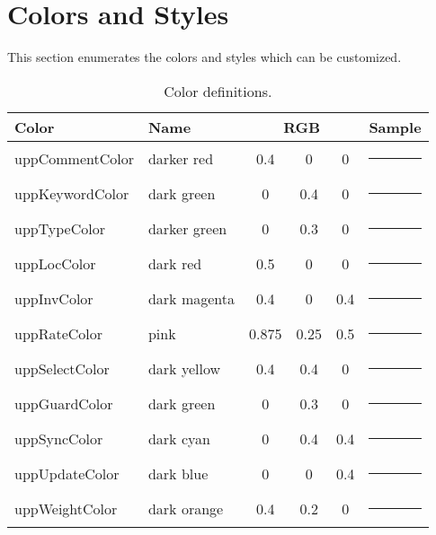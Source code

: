 \documentclass[a4paper,final]{article}
\begin{document}
\section{Colors and Styles}
This section enumerates the colors and styles which can be customized.

\begin{table}[ht]
  \caption{Color definitions.}\label{tab:colors}
  \centering
\begin{tabular}{llc@{, }c@{, }cl}
  \toprule
  {\bf Color} & {\bf Name} & \multicolumn{3}{c}{\bf RGB} & {\bf Sample} \\
  \midrule
  uppCommentColor & darker red & 0.4 & 0 & 0 & {\color{uppCommentColor}\rule{10mm}{3mm}} \\
  uppKeywordColor & dark green & 0 & 0.4 & 0 & {\color{uppKeywordColor}\rule{10mm}{3mm}} \\
  uppTypeColor & darker green & 0 & 0.3 & 0 & {\color{uppTypeColor}\rule{10mm}{3mm}} \\
  \midrule
  uppLocColor & dark red & 0.5 & 0 & 0 & {\color{uppLocColor}\rule{10mm}{3mm}} \\
  uppInvColor & dark magenta & 0.4 & 0 & 0.4 & {\color{uppInvColor}\rule{10mm}{3mm}} \\
  uppRateColor & pink & 0.875 & 0.25 & 0.5 & {\color{uppRateColor}\rule{10mm}{3mm}} \\
  uppSelectColor & dark yellow & 0.4 & 0.4 & 0 & {\color{uppSelectColor}\rule{10mm}{3mm}} \\
  uppGuardColor & dark green & 0 & 0.3 & 0 & {\color{uppGuardColor}\rule{10mm}{3mm}} \\
  uppSyncColor & dark cyan & 0 & 0.4 & 0.4 & {\color{uppSyncColor}\rule{10mm}{3mm}} \\
  uppUpdateColor & dark blue & 0 & 0 & 0.4 & {\color{uppUpdateColor}\rule{10mm}{3mm}} \\
  uppWeightColor & dark orange & 0.4 & 0.2 & 0 & {\color{uppWeightColor}\rule{10mm}{3mm}} \\
  \bottomrule
\end{tabular}
\end{table}
\end{document}
